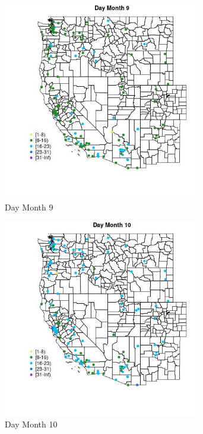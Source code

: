\begin{figure} 
\centering  
\includegraphics[width=0.77\textwidth]{Code_Outputs/Report_ML_input_PM25_Step4_part_e_de_duplicated_aves_MapObsMo9Day.jpg} 
\caption{\label{fig:Report_ML_input_PM25_Step4_part_e_de_duplicated_avesMapObsMo9Day}Day Month 9} 
\end{figure} 
 

\begin{figure} 
\centering  
\includegraphics[width=0.77\textwidth]{Code_Outputs/Report_ML_input_PM25_Step4_part_e_de_duplicated_aves_MapObsMo10Day.jpg} 
\caption{\label{fig:Report_ML_input_PM25_Step4_part_e_de_duplicated_avesMapObsMo10Day}Day Month 10} 
\end{figure} 
 

